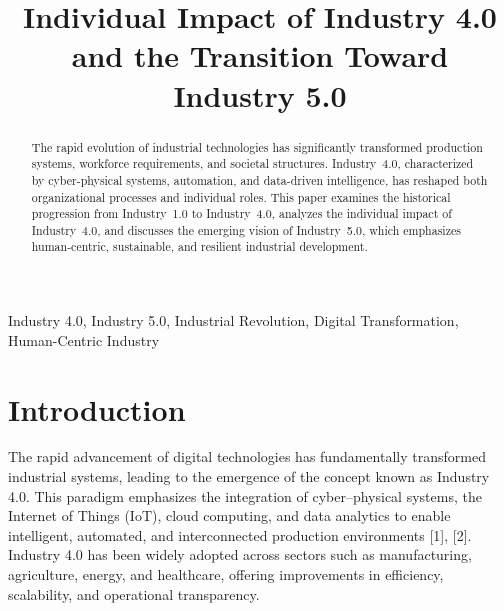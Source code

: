\documentclass[conference]{IEEEtran}
\begin{document}
\title{Individual Impact of Industry 4.0 and the Transition Toward Industry 5.0}

\author{
\and
{}
}

\maketitle

\begin{abstract}
The rapid evolution of industrial technologies has significantly transformed production systems, workforce requirements, and societal structures. Industry~4.0, characterized by cyber-physical systems, automation, and data-driven intelligence, has reshaped both organizational processes and individual roles. This paper examines the historical progression from Industry~1.0 to Industry~4.0, analyzes the individual impact of Industry~4.0, and discusses the emerging vision of Industry~5.0, which emphasizes human-centric, sustainable, and resilient industrial development.
\end{abstract}

\begin{IEEEkeywords}
Industry 4.0, Industry 5.0, Industrial Revolution, Digital Transformation, Human-Centric Industry
\end{IEEEkeywords}

\section{Introduction}
The rapid advancement of digital technologies has fundamentally transformed industrial systems, leading to the emergence of the concept known as Industry 4.0. This paradigm emphasizes the integration of cyber–physical systems, the Internet of Things (IoT), cloud computing, and data analytics to enable intelligent, automated, and interconnected production environments [1], [2]. Industry 4.0 has been widely adopted across sectors such as manufacturing, agriculture, energy, and healthcare, offering improvements in efficiency, scalability, and operational transparency.
\end{document}
